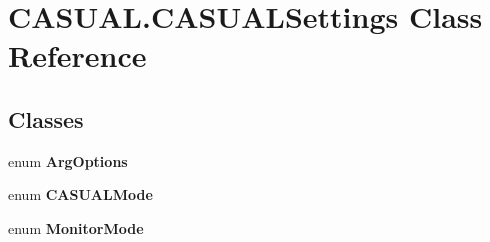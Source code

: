 \hypertarget{class_c_a_s_u_a_l_1_1_c_a_s_u_a_l_settings}{\section{C\-A\-S\-U\-A\-L.\-C\-A\-S\-U\-A\-L\-Settings Class Reference}
\label{class_c_a_s_u_a_l_1_1_c_a_s_u_a_l_settings}
}
\subsection*{Classes}
\begin{DoxyCompactItemize}
\item 
enum {\bfseries Arg\-Options}
\item 
enum {\bfseries C\-A\-S\-U\-A\-L\-Mode}
\item 
enum {\bfseries Monitor\-Mode}
\end{DoxyCompactItemize}
